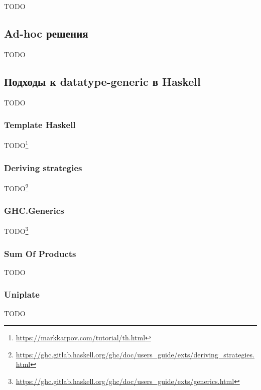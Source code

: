 TODO\cite{liu2023incremental} %

\subsection{Ad-hoc решения}


TODO %

\subsection{Подходы к datatype-generic в Haskell}

TODO %

\subsubsection{Template Haskell}





TODO\footnote{\url{https://markkarpov.com/tutorial/th.html}} %

\subsubsection{Deriving strategies}




TODO\footnote{\url{https://ghc.gitlab.haskell.org/ghc/doc/users_guide/exts/deriving_strategies.html}} %

\subsubsection{GHC.Generics}

TODO\footnote{\url{https://ghc.gitlab.haskell.org/ghc/doc/users_guide/exts/generics.html}} %

\subsubsection{Sum Of Products}

TODO %

\subsubsection{Uniplate}


TODO %


